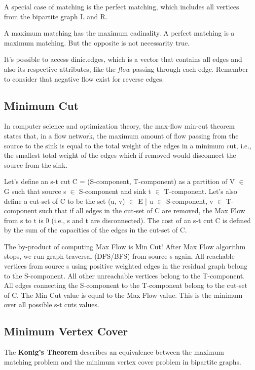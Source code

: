 		A special case of matching is the perfect matching, which includes all vertices from the bipartite graph L and R.

		A maximum matching has the maximum cadinality. A perfect matching is a maximum matching. 
		But the opposite is not necessarity true.

		It's possible to access dinic.edges, which is a vector that contains all edges and also its respective attributes, 
		like the \textit{flow} passing through each edge. Remember to consider that negative flow exist for reverse edges.

	\subsection{Minimum Cut}

		In computer science and optimization theory, the max-flow min-cut theorem states that, in a flow network, 
		the maximum amount of flow passing from the source to the sink is equal to the total weight of the edges 
		in a minimum cut, i.e., the smallest total weight of the edges which if removed would disconnect the source from the sink. 

		Let's define an s-t cut C = (S-component, T-component) as a partition of V $\in$ G such that 
		source s $\in$ S-component and sink t $\in$ T-component. Let's also define a cut-set of C to be the set 
		(u, v) $\in$ E | u $\in$ S-component, v $\in$ T-component such that if all edges in the cut-set of C are removed,
		the Max Flow from s to t is 0 (i.e., s and t are disconnected). The cost of an s-t cut C is defined by the sum
		of the capacities of the edges in the cut-set of C.

		The by-product of computing Max Flow is Min Cut! After Max Flow algorithm stops, we run graph traversal (DFS/BFS)
		from source s again. All reachable vertices from source s using positive weighted edges in the residual graph belong
		to the S-component. All other unreachable vertices belong to the T-component. All edges connecting the S-component to
		the T-component belong to the cut-set of C. The Min Cut value is equal to the Max Flow value.
		This is the minimum over all possible s-t cuts values.

	\subsection{Minimum Vertex Cover}

		The \textbf{Konig's Theorem} describes an equivalence between the maximum matching
		problem and the minimum vertex cover problem in bipartite graphs.

